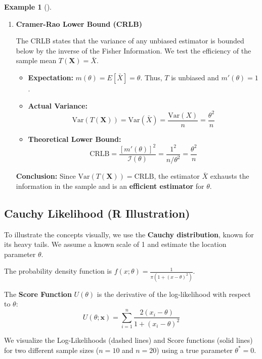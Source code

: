 \documentclass[
  letterpaper,
  DIV=11,
  numbers=noendperiod]{scrreprt}
\providecommand{\tightlist}{%
  \setlength{\itemsep}{0pt}\setlength{\parskip}{0pt}}
\renewcommand{\[}{\begin{equation}}
\renewcommand{\]}{\end{equation}}
\theoremstyle{definition}
\theoremstyle{plain}
\theoremstyle{plain}
\theoremstyle{plain}
\theoremstyle{definition}
\newtheorem{example}{Example}[chapter]
\theoremstyle{plain}
\theoremstyle{remark}
\begin{document}
\begin{example}[]
\begin{enumerate}
  \textbf{Result:} \(\text{Var}(U) = \mathcal{I}(\theta)\). (Identity
  Verified)
\item
  \textbf{Cramer-Rao Lower Bound (CRLB)}

  The CRLB states that the variance of any unbiased estimator is bounded
  below by the inverse of the Fisher Information. We test the efficiency
  of the sample mean \(T(\mathbf{X}) = \bar{X}\).

  \begin{itemize}
  \tightlist
  \item
    \textbf{Expectation:} \(m(\theta) = E[\bar{X}] = \theta\). Thus,
    \(T\) is unbiased and \(m'(\theta) = 1\).
  \item
    \textbf{Actual Variance:} \[
    \text{Var}(T(\mathbf{X})) = \text{Var}(\bar{X}) = \frac{\text{Var}(X)}{n} = \frac{\theta^2}{n}
    \]
  \item
    \textbf{Theoretical Lower Bound:} \[
    \text{CRLB} = \frac{[m'(\theta)]^2}{\mathcal{I}(\theta)} = \frac{1^2}{n/\theta^2} = \frac{\theta^2}{n}
    \]
  \end{itemize}

  \textbf{Conclusion:} Since
  \(\text{Var}(T(\mathbf{X})) = \text{CRLB}\), the estimator \(\bar{X}\)
  exhausts the information in the sample and is an \textbf{efficient
  estimator} for \(\theta\).
\end{enumerate}

\end{example}

\subsection{Cauchy Likelihood (R
Illustration)}\label{cauchy-likelihood-r-illustration}

To illustrate the concepts visually, we use the \textbf{Cauchy
distribution}, known for its heavy tails. We assume a known scale of 1
and estimate the location parameter \(\theta\).

The probability density function is
\(f(x; \theta) = \frac{1}{\pi (1 + (x-\theta)^2)}\).

The \textbf{Score Function} \(U(\theta)\) is the derivative of the
log-likelihood with respect to \(\theta\): \[
U(\theta; \mathbf{x}) = \sum_{i=1}^n \frac{2(x_i - \theta)}{1 + (x_i - \theta)^2}
\]

We visualize the Log-Likelihoods (dashed lines) and Score functions
(solid lines) for two different sample sizes (\(n=10\) and \(n=20\))
using a true parameter \(\theta^* = 0\).
\end{document}
